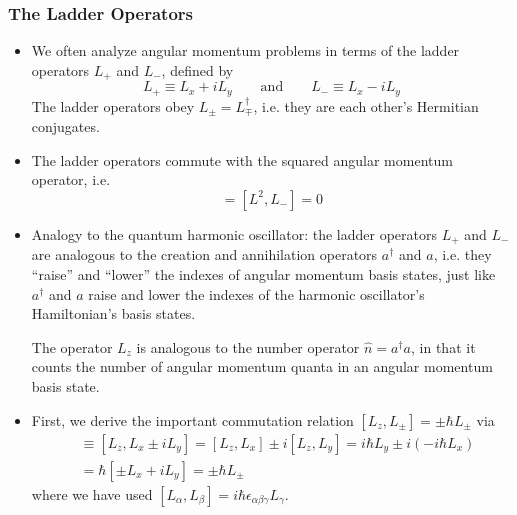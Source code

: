 \documentclass[11pt, a4paper]{article}
\newcommand{\eqtext}[1]{\qquad \text{#1} \qquad}
\newcommand{\Herm}{Hermitian\xspace}
\begin{document}
\subsubsection{The Ladder Operators}
\begin{itemize}
	\item We often analyze angular momentum problems in terms of the ladder operators $ L_{+} $ and $ L_{-} $, defined by
	\begin{equation*}
		L_{+} \equiv L_{x} + iL_{y} \eqtext{and} L_{-} \equiv L_{x} - i L_{y}
	\end{equation*}
	The ladder operators obey $ L_{\pm} = L_{\mp}^{\dagger} $, i.e. they are each other's \Herm conjugates.
	
	\item The ladder operators commute with the squared angular momentum operator, i.e.
	\begin{equation*}
		[L^{2}, L_{+}] = [L^{2}, L_{-}] = 0
	\end{equation*}
	
	\item Analogy to the quantum harmonic oscillator: the ladder operators $ L_{+} $ and $ L_{-} $ are analogous to the creation and annihilation operators $ a^{\dagger} $  and $ a $, i.e. they ``raise'' and ``lower'' the indexes of angular momentum basis states, just like $ a^{\dagger} $ and $ a $ raise and lower the indexes of the harmonic oscillator's Hamiltonian's basis states. 
	
	The operator $ L_{z} $ is analogous to the number operator $ \hat{n} = a^{\dagger}a $, in that it counts the number of angular momentum quanta in an angular momentum basis state. 
	
	\item First, we derive the important commutation relation $ [L_{z}, L_{\pm}] = \pm \hbar L_{\pm} $ via
	\begin{align*}
		[L_{z}, L_{\pm}] &\equiv [L_{z}, L_{x} \pm i L_{y}] = [L_{z}, L_{x}] \pm i [L_{z}, L_{y}] = i \hbar L_{y} \pm i(-i \hbar L_{x})\\
		& = \hbar [\pm L_{x} + iL_{y}] = \pm \hbar L_{\pm}
	\end{align*}
	where we have used $ [L_{\alpha}, L_{\beta}] = i \hbar \epsilon_{\alpha \beta \gamma} L_{\gamma} $.
	

\end{itemize}
\end{document}
